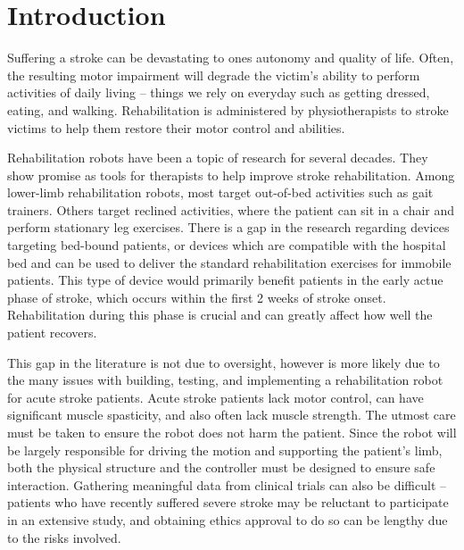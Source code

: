 \documentclass[12pt]{report}
\begin{document}
\afterpage{\null\newpage}

\chapter{Introduction}

Suffering a stroke can be devastating to ones autonomy and quality of life. Often, the resulting motor impairment will degrade the victim's ability to perform activities of daily living -- things we rely on everyday such as getting dressed, eating, and walking. Rehabilitation is administered by physiotherapists to stroke victims to help them restore their motor control and abilities. 

Rehabilitation robots have been a topic of research for several decades. They show promise as tools for therapists to help improve stroke rehabilitation. Among lower-limb rehabilitation robots, most target out-of-bed activities such as gait trainers. Others target reclined activities, where the patient can sit in a chair and perform stationary leg exercises. There is a gap in the research regarding devices targeting bed-bound patients, or devices which are compatible with the hospital bed and can be used to deliver the standard rehabilitation exercises for immobile patients. This type of device would primarily benefit patients in the early actue phase of stroke, which occurs within the first 2 weeks of stroke onset. Rehabilitation during this phase is crucial and can greatly affect how well the patient recovers. 

This gap in the literature is not due to oversight, however is more likely due to the many issues with building, testing, and implementing a rehabilitation robot for acute stroke patients. Acute stroke patients lack motor control, can have significant muscle spasticity, and also often lack muscle strength. The utmost care must be taken to ensure the robot does not harm the patient. Since the robot will be largely responsible for driving the motion and supporting the patient's limb, both the physical structure and the controller must be designed to ensure safe interaction. Gathering meaningful data from clinical trials can also be difficult -- patients who have recently suffered severe stroke may be reluctant to participate in an extensive study, and obtaining ethics approval to do so can be lengthy due to the risks involved. 
\end{document}
